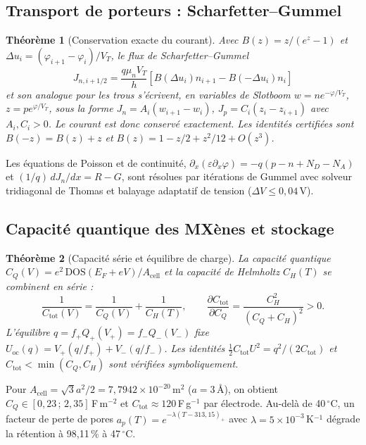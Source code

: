 \documentclass[11pt,a4paper,french]{article}
\newtheorem{theoreme}{Théorème}
\begin{document}
\subsection{Transport de porteurs : Scharfetter--Gummel}

\begin{theoreme}[Conservation exacte du courant]
Avec $B(z)=z/(e^z-1)$ et $\Delta u_i=(\varphi_{i+1}-\varphi_i)/V_T$, le flux de Scharfetter--Gummel
\begin{equation}
  J_{n,i+1/2}=\frac{q\mu_n V_T}{h}\left[B(\Delta u_i)n_{i+1}-B(-\Delta u_i)n_i\right]
  \label{eq:sg}
\end{equation}
et son analogue pour les trous s'écrivent, en variables de Slotboom $w=ne^{-\varphi/V_T}$, $z=pe^{\varphi/V_T}$, sous la forme $J_n=A_i(w_{i+1}-w_i)$, $J_p=C_i(z_i-z_{i+1})$ avec $A_i,C_i>0$. Le courant est donc conservé exactement. Les identités certifiées sont $B(-z)=B(z)+z$ et $B(z)=1-z/2+z^2/12+O(z^3)$.
\end{theoreme}
Les équations de Poisson et de continuité, $\partial_x(\varepsilon\partial_x\varphi)=-q(p-n+N_D-N_A)$ et $(1/q)\,dJ_n/dx=R-G$, sont résolues par itérations de Gummel avec solveur tridiagonal de Thomas et balayage adaptatif de tension ($\Delta V\leq0{,}04$\,V).

\subsection{Capacité quantique des MXènes et stockage}

\begin{theoreme}[Capacité série et équilibre de charge]
La capacité quantique $C_Q(V)=e^2\,\mathrm{DOS}(E_F+eV)/A_{\mathrm{cell}}$ et la capacité de Helmholtz $C_H(T)$ se combinent en série :
\begin{equation}
  \frac{1}{C_{\mathrm{tot}}(V)}=\frac{1}{C_Q(V)}+\frac{1}{C_H(T)},\qquad
  \frac{\partial C_{\mathrm{tot}}}{\partial C_Q}=\frac{C_H^2}{(C_Q+C_H)^2}>0.
  \label{eq:cq}
\end{equation}
L'équilibre $q=f_+Q_+(V_+)=f_-Q_-(V_-)$ fixe $U_{\mathrm{oc}}(q)=V_+(q/f_+)+V_-(q/f_-)$. Les identités $\tfrac12 C_{\mathrm{tot}}U^2=q^2/(2C_{\mathrm{tot}})$ et $C_{\mathrm{tot}}<\min(C_Q,C_H)$ sont vérifiées symboliquement.
\end{theoreme}
Pour $A_{\mathrm{cell}}=\sqrt3a^2/2=7{,}7942\times10^{-20}$\,m$^2$ ($a=3$\,Å), on obtient $C_Q\in[0{,}23\,;\,2{,}35]$\,F\,m$^{-2}$ et $C_{\mathrm{tot}}\approx120$\,F\,g$^{-1}$ par électrode. Au-delà de 40\,$^\circ$C, un facteur de perte de pores $a_p(T)=e^{-\lambda(T-313{,}15)_+}$ avec $\lambda=5\times10^{-3}$\,K$^{-1}$ dégrade la rétention à 98,11\,\% à 47\,$^\circ$C.
\end{document}
